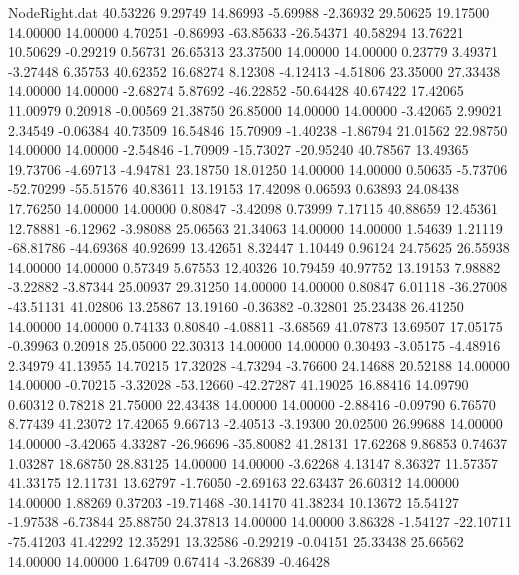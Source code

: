 \begin{filecontents}{NodeRight.dat}
  40.53226    9.29749   14.86993    -5.69988   -2.36932   29.50625   19.17500   14.00000   14.00000    4.70251   -0.86993  -63.85633  -26.54371
  40.58294   13.76221   10.50629    -0.29219    0.56731   26.65313   23.37500   14.00000   14.00000    0.23779    3.49371   -3.27448    6.35753
  40.62352   16.68274    8.12308    -4.12413   -4.51806   23.35000   27.33438   14.00000   14.00000   -2.68274    5.87692  -46.22852  -50.64428
  40.67422   17.42065   11.00979     0.20918   -0.00569   21.38750   26.85000   14.00000   14.00000   -3.42065    2.99021    2.34549   -0.06384
  40.73509   16.54846   15.70909    -1.40238   -1.86794   21.01562   22.98750   14.00000   14.00000   -2.54846   -1.70909  -15.73027  -20.95240
  40.78567   13.49365   19.73706    -4.69713   -4.94781   23.18750   18.01250   14.00000   14.00000    0.50635   -5.73706  -52.70299  -55.51576
  40.83611   13.19153   17.42098     0.06593    0.63893   24.08438   17.76250   14.00000   14.00000    0.80847   -3.42098    0.73999    7.17115
  40.88659   12.45361   12.78881    -6.12962   -3.98088   25.06563   21.34063   14.00000   14.00000    1.54639    1.21119  -68.81786  -44.69368
  40.92699   13.42651    8.32447     1.10449    0.96124   24.75625   26.55938   14.00000   14.00000    0.57349    5.67553   12.40326   10.79459
  40.97752   13.19153    7.98882    -3.22882   -3.87344   25.00937   29.31250   14.00000   14.00000    0.80847    6.01118  -36.27008  -43.51131
  41.02806   13.25867   13.19160    -0.36382   -0.32801   25.23438   26.41250   14.00000   14.00000    0.74133    0.80840   -4.08811   -3.68569
  41.07873   13.69507   17.05175    -0.39963    0.20918   25.05000   22.30313   14.00000   14.00000    0.30493   -3.05175   -4.48916    2.34979
  41.13955   14.70215   17.32028    -4.73294   -3.76600   24.14688   20.52188   14.00000   14.00000   -0.70215   -3.32028  -53.12660  -42.27287
  41.19025   16.88416   14.09790     0.60312    0.78218   21.75000   22.43438   14.00000   14.00000   -2.88416   -0.09790    6.76570    8.77439
  41.23072   17.42065    9.66713    -2.40513   -3.19300   20.02500   26.99688   14.00000   14.00000   -3.42065    4.33287  -26.96696  -35.80082
  41.28131   17.62268    9.86853     0.74637    1.03287   18.68750   28.83125   14.00000   14.00000   -3.62268    4.13147    8.36327   11.57357
  41.33175   12.11731   13.62797    -1.76050   -2.69163   22.63437   26.60312   14.00000   14.00000    1.88269    0.37203  -19.71468  -30.14170
  41.38234   10.13672   15.54127    -1.97538   -6.73844   25.88750   24.37813   14.00000   14.00000    3.86328   -1.54127  -22.10711  -75.41203
  41.42292   12.35291   13.32586    -0.29219   -0.04151   25.33438   25.66562   14.00000   14.00000    1.64709    0.67414   -3.26839   -0.46428

\end{filecontents}
